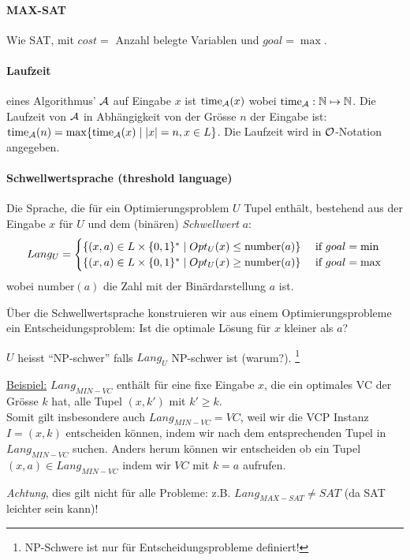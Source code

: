 \paragraph{MAX-SAT}
Wie SAT, mit $cost = $ Anzahl belegte Variablen und $goal = \max$.

\paragraph{Laufzeit}
eines Algorithmus' $\mathcal{A}$ auf Eingabe $x$ ist $\text{time}_{\mathcal{A}} (x)$
wobei $\text{time}_{\mathcal{A}}: \mathbb{N} \mapsto \mathbb{N}$.
Die Laufzeit von $\mathcal{A}$ in Abhängigkeit von der Grösse $n$ der Eingabe ist:
$\text{time}_{\mathcal{A}} (n) = \max \{ \text{time}_{\mathcal{A}} (x) \; | \; |x| = n, x \in L \}$.
Die Laufzeit wird in  $\mathcal{O}$-Notation angegeben.

\paragraph{Schwellwertsprache (threshold language)}
Die Sprache, die für ein Optimierungsproblem $U$ Tupel enthält, bestehend aus der Eingabe $x$ für $U$
und dem (binären) \emph{Schwellwert} $a$:
$$
Lang_U = \begin{cases}
\{ (x, a) \in L \times \lbrace 0, 1 \rbrace^* \; | \; Opt_U(x) \leq \text{number}(a) \} & \text{ if $goal = \min$}
\\
\{ (x, a) \in L \times \lbrace 0, 1 \rbrace^* \; | \; Opt_U(x) \geq \text{number}(a) \} & \text{ if $goal = \max$}
\end{cases}
$$
wobei $\text{number}(a)$ die Zahl mit der Binärdarstellung $a$ ist.

Über die Schwellwertsprache konstruieren wir aus einem Optimierungsprobleme ein Entscheidungsproblem:
Ist die optimale Lösung für $x$ kleiner als $a$?

$U$ heisst ``NP-schwer'' falls $Lang_U$ NP-schwer ist (warum?).%
\footnote{NP-Schwere ist nur für Entscheidungsprobleme definiert!}

\underline{Beispiel:}
$Lang_{MIN-VC}$ enthält für eine fixe Eingabe $x$, die ein optimales VC der Grösse $k$ hat,
alle Tupel $(x, k')$ mit $k' \geq k$.
\\
Somit gilt insbesondere auch $Lang_{MIN-VC} = VC$, weil wir die VCP Instanz $I=(x,k)$ entscheiden können,
indem wir nach dem entsprechenden Tupel in $Lang_{MIN-VC}$ suchen.
Anders herum können wir entscheiden ob ein Tupel $(x, a) \in Lang_{MIN-VC}$ indem wir $VC$ mit $k = a$ aufrufen.

\emph{Achtung}, dies gilt nicht für alle Probleme: z.B. $Lang_{MAX-SAT} \neq SAT$ (da SAT leichter sein kann)!

